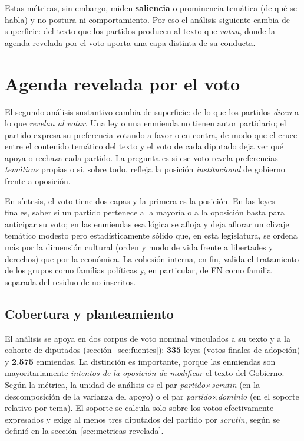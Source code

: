 Estas métricas, sin embargo, miden \textbf{saliencia} o prominencia temática (de
qué se habla) y no postura ni comportamiento. Por eso el análisis siguiente cambia de superficie:
del texto que los partidos producen al texto que \emph{votan}, donde la agenda
revelada por el voto aporta una capa distinta de su conducta.

\section{Agenda revelada por el voto}
\label{sec:res-revelada}

El segundo análisis sustantivo cambia de superficie: de lo que los partidos
\emph{dicen} a lo que \emph{revelan al votar}. Una ley o una enmienda no tienen
autor partidario; el partido expresa su preferencia votando a favor o en contra,
de modo que el cruce entre el contenido temático del texto y el voto de cada
diputado deja ver qué apoya o rechaza cada partido. La pregunta es si ese voto
revela preferencias \emph{temáticas} propias o si, sobre todo, refleja la
posición \emph{institucional} de gobierno frente a oposición.

En síntesis, el voto tiene dos capas y la primera es la posición. En las leyes
finales, saber si un partido pertenece a la mayoría o a la oposición basta para
anticipar su voto; en las enmiendas esa lógica se afloja y deja aflorar un
clivaje temático modesto pero estadísticamente sólido que, en esta legislatura,
se ordena más por la dimensión cultural (orden y modo de vida frente a
libertades y derechos) que por la económica. La cohesión interna, en fin, valida
el tratamiento de los grupos como familias políticas y, en particular, de FN
como familia separada del residuo de no inscritos.

\subsection{Cobertura y planteamiento}
\label{sec:res-revelada-cobertura}

El análisis se apoya en dos corpus de voto nominal vinculados a su texto y a la
cohorte de diputados (sección~\ref{sec:fuentes}): \textbf{335} leyes (votos
finales de adopción) y \textbf{2.575} enmiendas. La distinción es importante,
porque las enmiendas son mayoritariamente \emph{intentos de la oposición de
modificar} el texto del Gobierno. Según la métrica, la unidad de análisis es el
par \emph{partido$\times$scrutin} (en la descomposición de la varianza del apoyo)
o el par \emph{partido$\times$dominio} (en el soporte relativo por tema). El
soporte se calcula solo sobre los votos efectivamente expresados y exige al menos
tres diputados del partido por \emph{scrutin}, según se definió en la
sección~\ref{sec:metricas-revelada}.

